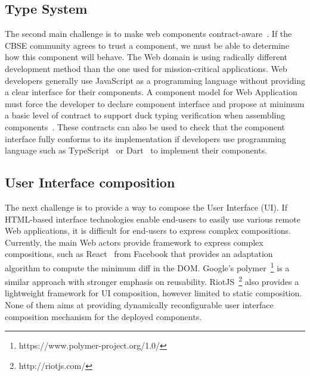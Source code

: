 
\subsection{Type System}
The second main challenge is to make web components contract-aware~\cite{beugnard1999making}. If the CBSE community agrees to trust a component, we must be able to determine how this component will behave. The Web domain is using radically different development method than the one used for mission-critical applications. Web developers generally use JavaScript as a programming language without providing a clear interface for their components. A component model for Web Application must force the developer to declare component interface and propose at minimum a basic level of contract to support duck typing verification when assembling components~\cite{beugnard1999making}. These contracts can also be used to check that the component interface fully conforms to its implementation if developers use programming language such as TypeScript~\cite{rastogi2015safe} or Dart~\cite{dhiman2012google} to implement their components.

\subsection{User Interface composition}
The next challenge is to provide a way to compose the User Interface (UI). If HTML-based interface technologies enable end-users to easily use various remote Web applications, it is difficult for end-users to express complex compositions. Currently, the main Web actors provide framework to express complex compositions, such as React~\cite{fedosejev2015react} from Facebook that provides an adaptation algorithm to compute the minimum diff in the DOM. Google's polymer~\footnote{https://www.polymer-project.org/1.0/} is a similar approach with stronger emphasis on reusability. RiotJS~\footnote{http://riotjs.com/} also provides a lightweight framework for UI composition, however limited to static composition.
None of them aims at providing dynamically reconfigurable user interface composition mechanism for the deployed components.

